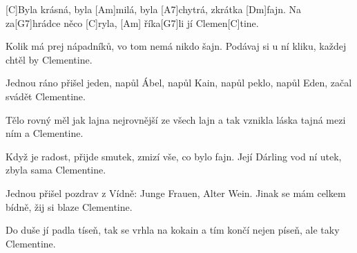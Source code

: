 
[C]Byla krásná, byla [Am]milá, byla [A7]chytrá, zkrátka [Dm]fajn.
Na za[G7]hrádce něco [C]ryla, [Am] říka[G7]li jí Clemen[C]tine.

Kolik má prej nápadníků, vo tom nemá nikdo šajn.
Podávaj si u ní kliku, každej chtěl by Clementine.

Jednou ráno přišel jeden, napůl Ábel, napůl Kain,
napůl peklo, napůl Eden, začal svádět Clementine.

Tělo rovný měl jak lajna nejrovnější ze všech lajn
a tak vznikla láska tajná mezi ním a Clementine.

Když je radost, přijde smutek, zmizí vše, co bylo fajn.
Její Dárling vod ní utek, zbyla sama Clementine.

Jednou přišel pozdrav z Vídně: Junge Frauen, Alter Wein.
Jinak se mám celkem bídně, žij si blaze Clementine.

Do duše jí padla tíseň, tak se vrhla na kokain
a tím končí nejen píseň, ale taky Clementine.
